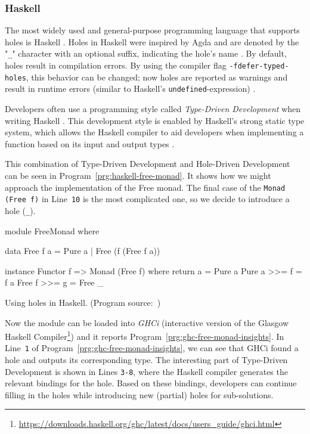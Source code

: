 \subsubsection{Haskell}
\label{sec:holes-languages-haskell}
The most widely used and general-purpose programming language that supports holes is Haskell \cite{tiobe_software_bv_tiobe_2023, stack_overflow_stack_2023}.
Holes in Haskell were inspired by Agda and are denoted by the "\verb|_|" character with an optional suffix, indicating the hole's name \cite{gamari_haskell_2019}.
By default, holes result in compilation errors.
By using the compiler flag \verb|-fdefer-typed-holes|, this behavior can be changed; now holes are reported as warnings and result in runtime errors (similar to Haskell's \verb|undefined|-expression) \cite{ghc_team_deferring_2023}.

Developers often use a programming style called \emph{Type-Driven Development} when writing Haskell \cite{gissurarson_suggesting_2018}.
This development style is enabled by Haskell's strong static type system, which allows the Haskell compiler to aid developers when implementing a function based on its input and output types \cite{gissurarson_suggesting_2018}.


This combination of Type-Driven Development and Hole-Driven Development can be seen in Program~\ref{prg:haskell-free-monad}.
It shows how we might approach the implementation of the Free monad.
The final case of the \texttt{Monad (Free f)} in Line~\verb|10| is the most complicated one, so we decide to introduce a hole (\verb|_|).

\begin{program}[ht]
\begin{GenericCode}
module FreeMonad where

data Free f a
  = Pure a
  | Free (f (Free f a))

instance Functor f => Monad (Free f) where
  return a     = Pure a
  Pure a >>= f = f a
  Free f >>= g = Free _
\end{GenericCode}
\caption{Using holes in Haskell. (Program source:~\cite{gamari_haskell_2019})}
\label{prg:haskell-free-monad}
\end{program}

Now the module can be loaded into \emph{GHCi} (interactive version of the Glasgow Haskell Compiler\footnote{\url{https://downloads.haskell.org/ghc/latest/docs/users_guide/ghci.html}}) and it reports Program~\ref{prg:ghc-free-monad-insights}.
In Line~\verb|1| of Program~\ref{prg:ghc-free-monad-insights}, we can see that GHCi found a hole and outputs its corresponding type.
The interesting part of Type-Driven Development is shown in Lines \verb|3-8|, where the Haskell compiler generates the relevant bindings for the hole.
Based on these bindings, developers can continue filling in the holes while introducing new (partial) holes for sub-solutions.

